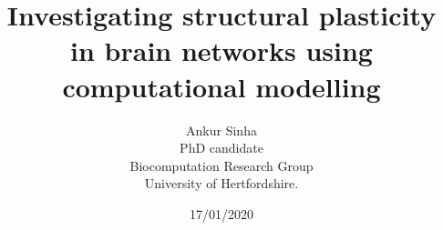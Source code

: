 
\usepackage{color}
\usepackage{tipa}
\usepackage[scale=2]{ccicons}
\usepackage{amssymb}
\usepackage{tikz}
\usetikzlibrary{mindmap, arrows.meta, positioning, arrows}
\usepackage{pgfplots}
\usepackage{jneurosci}
\usepackage{subfig}
\usepackage[T1]{fontenc}
\usepackage[utf8]{inputenc}
\usepackage[style=nature,backend=biber,autocite=footnote]{biblatex}

\usepackage[sfdefault]{roboto}
\usepackage[normalem]{ulem}
\usepackage{hyperref}
\hypersetup{colorlinks,linkcolor=Green,urlcolor=links}
\usepackage{graphicx}
\usepackage{algorithmic}
\usepackage{textcomp}
\usepackage{wrapfig}
\usepackage{textgreek}
\usepackage{euler}
\usepackage{csquotes}



\renewcommand{\footnoterule}{}

\title{Investigating structural plasticity in brain networks using computational modelling}
\author[Ankur Sinha]{Ankur Sinha\\PhD candidate\\Biocomputation Research Group\\University of Hertfordshire.}
\date{17/01/2020}




